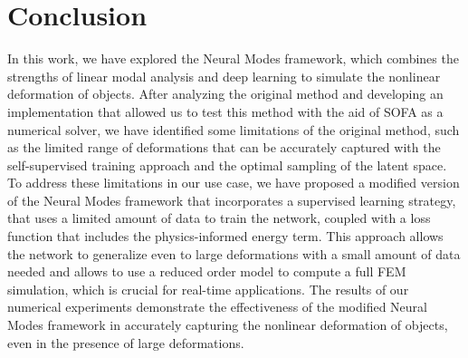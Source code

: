 \documentclass[11pt,a4paper]{article}
\numberwithin{equation}{section}
\begin{document}
















\section{Conclusion}
\label{sec:conclusion}
In this work, we have explored the Neural Modes framework, which combines the strengths of linear modal analysis and deep learning to simulate the nonlinear deformation of objects. After analyzing the original method and developing an implementation that allowed us to test this method with the aid of SOFA as a numerical solver, we have identified some limitations of the original method, such as the limited range of deformations that can be accurately captured with the self-supervised training approach and the optimal sampling of the latent space. To address these limitations in our use case, we have proposed a modified version of the Neural Modes framework that incorporates a supervised learning strategy, that uses a limited amount of data to train the network, coupled with a loss function that includes the physics-informed energy term. This approach allows the network to generalize even to large deformations with a small amount of data needed and allows to use a reduced order model to compute a full FEM simulation, which is crucial for real-time applications. The results of our numerical experiments demonstrate the effectiveness of the modified Neural Modes framework in accurately capturing the nonlinear deformation of objects, even in the presence of large deformations. 
\end{document}
